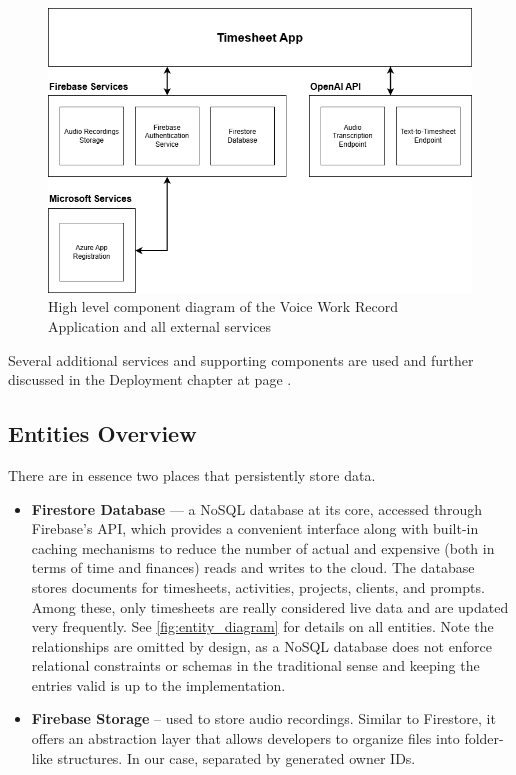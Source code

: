 \documentclass[
  digital,     %
  oneside,     %
  nosansbold,  %
  nocolorbold, %
  lof,         %
  lot,         %
]{fithesis4}
\begin{document}
\begin{figure}[ht]
    \centering
    \includegraphics[width=\textwidth]{assets/diagrams/timesheet_app_component_diagram.drawio.png}
    \caption{High level component diagram of the Voice Work Record Application and all external services}
    \label{fig:timesheet_app_architecture}
\end{figure}

Several additional services and supporting components are used and further discussed in the Deployment chapter at page \pageref{chap:deployment}.

\subsection{Entities Overview}

There are in essence two places that persistently store data.

\begin{itemize}
    \item \textbf{Firestore Database} — a \gls{NoSQL} database at its core, accessed through Firebase’s \gls{API}, which provides a convenient interface along with built-in caching mechanisms to reduce the number of actual and expensive (both in terms of time and finances) reads and writes to the cloud. The database stores documents for timesheets, activities, projects, clients, and prompts. Among these, only timesheets are really considered live data and are updated very frequently. See \ref{fig:entity_diagram} for details on all entities. Note the relationships are omitted by design, as a \gls{NoSQL} database does not enforce relational constraints or schemas in the traditional sense and keeping the entries valid is up to the implementation.
    
    \item \textbf{Firebase Storage} -- used to store audio recordings. Similar to Firestore, it offers an abstraction layer that allows developers to organize files into folder-like structures. In our case, separated by generated owner IDs.
\end{itemize}
\end{document}
